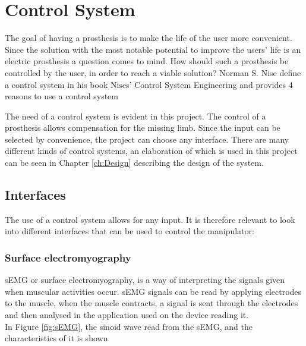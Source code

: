 \section{Control System}\label{Control}
The goal of having a prosthesis is to make the life of the user  more convenient. Since the solution with the most notable potential to improve the users' life is an electric prosthesis a question comes to mind. How should such a prosthesis be controlled by the user, in order to reach a viable solution? 
Norman S. Nise define a control system in his book Nises' Control System Engineering and provides 4 reasons to use a control system
 \label{Quote1}
\noindent The need of a control system is evident in this project. The control of a prosthesis allows compensation for the missing limb. Since the input can be selected by convenience, the project can choose any interface. There are many different kinds of control systems, an elaboration of which is used in this project can be seen in Chapter \ref{ch:Design} describing the design of the system. 
\subsection*{Interfaces}
The use of a control system allows for any input. It is therefore relevant to look into different interfaces that can be used to control the manipulator:

\subsubsection*{Surface electromyography}\label{sEMG}
sEMG or surface electromyography, is a way of interpreting the signals given when muscular activities occur. sEMG signals can be read by applying electrodes to the muscle, when the muscle contracts, a signal is sent through the electrodes and then analysed in the application used on the device reading it.\\
In Figure \ref{fig:sEMG}, the sinoid wave read from the sEMG, and the characteristics of it is shown 

